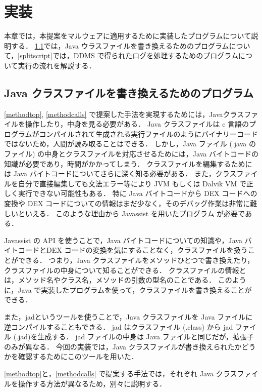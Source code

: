 \section{実装}
\label{sec:instrument}
本章では，本提案をマルウェアに適用するために実装したプログラムについて説明する．
\ref{programforclass}では，Java ウラスファイルを書き換えるためのプログラムについて，\ref{splitscript}では，DDMS で得られたログを処理するためのプログラムについて実行の流れを解説する．

\subsection{Java クラスファイルを書き換えるためのプログラム}
\label{programforclass}
\ref{methodtop}, \ref{methodcalls} で提案した手法を実現するためには，Javaクラスファイルを操作したり，中身を見る必要がある．
Java クラスファイルは c 言語のプログラムがコンパイルされて生成される実行ファイルのようにバイナリーコードではないため，人間が読み取ることはできる．
しかし，Java ファイル (.java のファイル) の中身とクラスファイルを対応させるためには，Java バイトコードの知識が必要であり，時間がかかってしまう．
クラスファイルを編集するためには Java バイトコードについてさらに深く知る必要がある．
また，クラスファイルを自分で直接編集しても文法エラー等により JVM もしくは Dalvik VM で正しく実行できない可能性もある．
特に Java バイトコードから DEX コードへの変換や DEX コードについての情報はまだ少なく，そのデバッグ作業は非常に難しいといえる．
このような理由から Javassist\cite{javassist} を用いたプログラム が必要である．

Javassist の API を使うことで，Java バイトコードについての知識や，Java バイトコードとDEX コードの変換を気にすることなく，クラスファイルを扱うことができる．
つまり，Java クラスファイルをメソッドひとつで書き換えたり，クラスファイルの中身について知ることができる．
クラスファイルの情報とは，メソッド名やクラス名，メソッドの引数の型名のことである．
このように，Java で実装したプログラムを使って，クラスファイルを書き換えることができる．

また，jad\cite{jad}というツールを使うことで，Java クラスファイルを Java ファイルに逆コンパイルすることもできる．
jad はクラスファイル (.class) から jad ファイル (.jad)を生成する．
jad ファイルの中身は Java ファイルと同じだが，拡張子のみが異なる．
今回の実装では，Java クラスファイルが書き換えられたかどうかを確認するためにこのツールを用いた．

\ref{methodtop}と，\ref{methodcalls} で提案する手法では，それぞれ Java クラスファイルを操作する方法が異なるため，別々に説明する．


